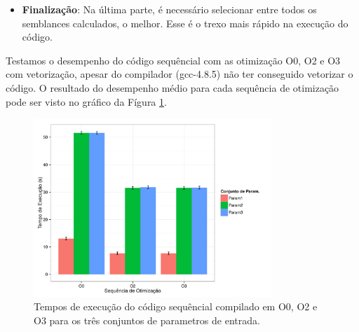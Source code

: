 \documentclass[12pt]{article}
\begin{document}
\begin{itemize}
\begin{lstlisting}[language=c, caption=Corpo da função \textit{semblance\_2d}., label=semblance]
    for (int i = 0; i < ap->traces.len; i++) {
        tr = vector_get(ap->traces, i);

        float mx, my, hx, hy;
        su_get_midpoint(tr, &mx, &my);
        su_get_halfoffset(tr, &hx, &hy);

        float t = time_2d(A, B, C, D, E, t0, m0, my, h0, hy);
        int it = (int)(t * idt);

        if (it - tau >= 0 && it + tau < tr->ns) {
            for (int j = 0; j < w; j++) {
                int k = it + j - tau;
                float v = interpol_linear(k, k+1,
                        tr->data[k], tr->data[k+1],
                        t*idt + j - tau);
                num[j] += v;
                den[j] += v*v;
                _stack += v;
            }
            M++;
        } else if (++skip == 2) {
            return 0;
        }
    }
\end{lstlisting}

A função \textit{semblance\_2d} possui dois acessos a dados na memória, o primeiro, na linha 2, acessa os \textit{traces} e o seguindo, dentro do \textit{loop}, acessa \textit{data}. Ambos os acessos são sequênciais, por isso, acredita-se que tenham boa localidade.
\\
\item \textbf{Finalização}: Na última parte, é necessário selecionar entre todos os semblances calculados, o melhor. Esse é o trexo mais rápido na execução do código.

\end{itemize}

Testamos o desempenho do código sequêncial com as otimização O0, O2 e O3 com vetorização, apesar do compilador (gcc-4.8.5) não ter conseguido vetorizar o código. O resultado do desempenho médio para cada sequência de otimização pode ser visto no gráfico da Fígura \ref{fgsequencial}.


\begin{figure}[H]
\centering
\includegraphics[width=0.8\textwidth]{seq.pdf}
\caption{Tempos de execução do código sequêncial compilado em O0, O2 e O3 para os três conjuntos de parametros de entrada.}
\label{fgsequencial}
\end{figure}
\end{document}
